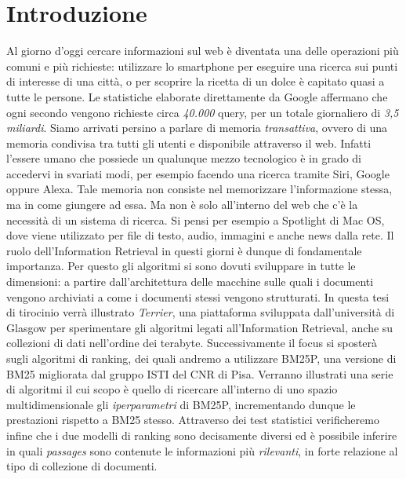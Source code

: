 \chapter{Introduzione}
Al giorno d'oggi cercare informazioni sul web è diventata una delle operazioni più comuni e più richieste:
utilizzare lo smartphone per eseguire una ricerca sui punti di interesse di una città, o per scoprire la ricetta di un dolce è capitato quasi a tutte le persone.
Le statistiche elaborate direttamente da Google affermano che ogni secondo vengono richieste circa \textit{40.000} query, per un totale
giornaliero di \textit{3,5 miliardi}.
Siamo arrivati persino a parlare di memoria \textit{transattiva}, ovvero di una memoria condivisa tra tutti gli utenti e disponibile attraverso il web.
Infatti l'essere umano che possiede un qualunque mezzo tecnologico è in grado di accedervi in svariati modi, per esempio facendo una ricerca tramite Siri, Google oppure Alexa.
Tale memoria non consiste nel memorizzare l'informazione stessa, ma in come giungere ad essa.
Ma non è solo all'interno del web che c'è la necessità di un sistema di ricerca. Si pensi per esempio a Spotlight di Mac OS, dove
viene utilizzato  per file di testo, audio, immagini e anche news dalla rete.
Il ruolo dell'Information Retrieval in questi giorni è dunque di fondamentale importanza.
Per questo gli algoritmi si sono dovuti sviluppare in tutte le dimensioni: a partire dall'architettura delle macchine sulle quali i documenti vengono archiviati a come i documenti stessi vengono strutturati. In questa tesi di tirocinio verrà illustrato \textit{Terrier}, una piattaforma sviluppata dall'università di Glasgow
per sperimentare gli algoritmi legati all'Information Retrieval, anche su collezioni di dati nell'ordine dei terabyte.  Successivamente il focus si sposterà
sugli algoritmi di ranking, dei quali andremo a utilizzare BM25P, una versione di BM25 migliorata dal gruppo ISTI del CNR di Pisa.
Verranno illustrati una serie di algoritmi il cui scopo è quello di ricercare all'interno di uno spazio multidimensionale
gli \textit{iperparametri} di BM25P, incrementando dunque le prestazioni rispetto a BM25 stesso.
Attraverso dei test statistici verificheremo infine che i due modelli di ranking sono decisamente diversi ed è possibile
inferire in quali \textit{passages} sono contenute le informazioni più \textit{rilevanti}, in forte relazione al tipo di collezione di documenti.